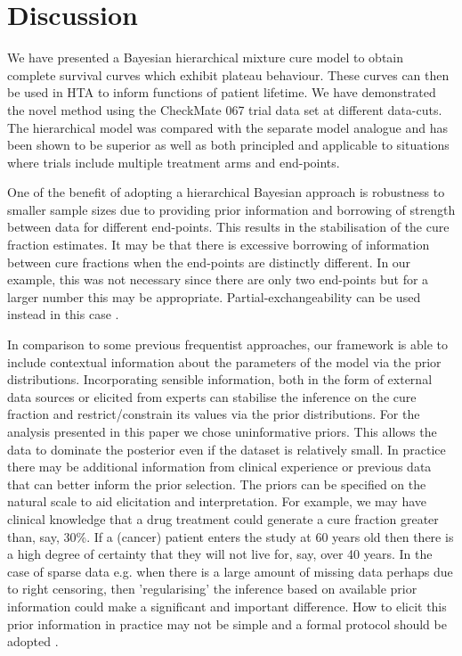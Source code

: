\documentclass[AMA,STIX1COL]{WileyNJD-v2}
\begin{document}



%
\section{Discussion}\label{sec:discussion}
We have presented a Bayesian hierarchical mixture cure model to obtain complete survival curves which exhibit plateau behaviour. These curves can then be used in HTA to inform functions of patient lifetime.
We have demonstrated the novel method using the CheckMate 067 trial data set at different data-cuts.
The hierarchical model was compared with the separate model analogue and has been shown to be superior as well as both principled and applicable to situations where trials include multiple treatment arms and end-points.

One of the benefit of adopting a hierarchical Bayesian approach is robustness to smaller sample sizes due to providing prior information and borrowing of strength between data for different end-points.
This results in the stabilisation of the cure fraction estimates.
It may be that there is excessive borrowing of information between cure fractions when the end-points are distinctly different.
In our example, this was not necessary since there are only two end-points but for a larger number this may be appropriate.
Partial-exchangeability can be used instead in this case \cite{Neuenschwander2016}.

In comparison to some previous frequentist approaches, our framework is able to include contextual information about the parameters of the model via the prior distributions.
Incorporating sensible information, both in the form of external data sources or elicited from experts can
stabilise the inference on the cure fraction and restrict/constrain its values via the prior distributions.
For the analysis presented in this paper we chose uninformative priors.
This allows the data to dominate the posterior even if the dataset is relatively small.
In practice there may be additional information from clinical experience or previous data that can better inform the prior selection.
The priors can be specified on the natural scale to aid elicitation and interpretation.
For example, we may have clinical knowledge that a drug treatment could generate a cure fraction greater than, say, 30\%.
If a (cancer) patient enters the study at 60 years old then there is a high degree of certainty that they will not live for, say, over 40 years.
In the case of sparse data e.g. when there is a large amount of missing data perhaps due to right censoring, then 'regularising' the inference based on available prior information could make a significant and important difference.
How to elicit this prior information in practice may not be simple and a formal protocol should be adopted \cite{OHagan2019}.
\end{document}
